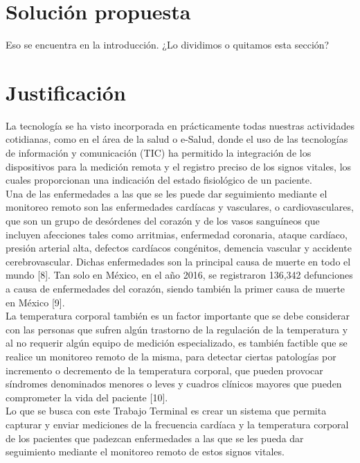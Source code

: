 \section{Solución propuesta}
Eso se encuentra en la introducción. ¿Lo dividimos o quitamos esta sección?

\section{Justificación}
La tecnología se ha visto incorporada en prácticamente todas nuestras actividades cotidianas, como en el área de la salud o e-Salud, donde el uso de las tecnologías de información y comunicación (TIC) ha permitido la integración de los dispositivos para la medición remota y el registro preciso de los signos vitales, los cuales proporcionan una indicación del estado fisiológico de un paciente.\\

Una de las enfermedades a las que se les puede dar seguimiento mediante el monitoreo remoto son las enfermedades cardíacas y vasculares, o cardiovasculares, que son un grupo de desórdenes del corazón y de los vasos sanguíneos que incluyen afecciones tales como arritmias, enfermedad coronaria, ataque cardíaco, presión arterial alta, defectos cardíacos congénitos, demencia vascular y accidente cerebrovascular. Dichas enfermedades son la principal causa de muerte en todo el mundo  [8].  Tan solo en México, en el año 2016, se registraron 136,342 defunciones a causa de enfermedades del corazón, siendo también la primer causa de muerte en México [9].\\

La temperatura corporal también es un factor importante que se debe considerar con las personas que sufren algún trastorno de la regulación de la temperatura y al no requerir algún equipo de medición especializado, es también factible que se realice un monitoreo remoto de la misma, para detectar ciertas patologías por incremento o decremento de la temperatura corporal, que pueden provocar síndromes denominados menores o leves y cuadros clínicos mayores que pueden comprometer la vida del paciente [10].\\

Lo que se busca con este Trabajo Terminal es crear un sistema que permita capturar y enviar mediciones de la frecuencia cardíaca y la temperatura corporal de los pacientes que padezcan enfermedades a las que se les pueda dar seguimiento mediante el monitoreo remoto de estos signos vitales.\\

